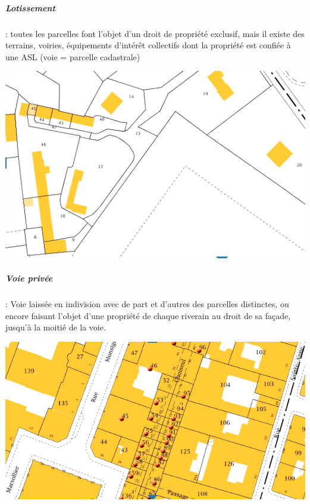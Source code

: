 			\subparagraph{Lotissement} : toutes les parcelles font l’objet d’un droit de propriété exclusif, mais il existe des terrains, voiries, équipements d’intérêt collectifs dont la propriété est confiée à une ASL (voie = parcelle cadastrale)
			\begin{center}
				\includegraphics[width=0.7\linewidth]{images/lotissement}
			\end{center}
			
			
			\subparagraph{Voie privée} : Voie laissée en indivision avec de part et d’autres des parcelles distinctes, ou encore faisant l’objet d’une propriété de chaque riverain au droit de sa façade, jusqu’à la moitié de la voie.
			\begin{center}
				\includegraphics[width=0.7\linewidth]{images/voiePrivee}
			\end{center}
			
